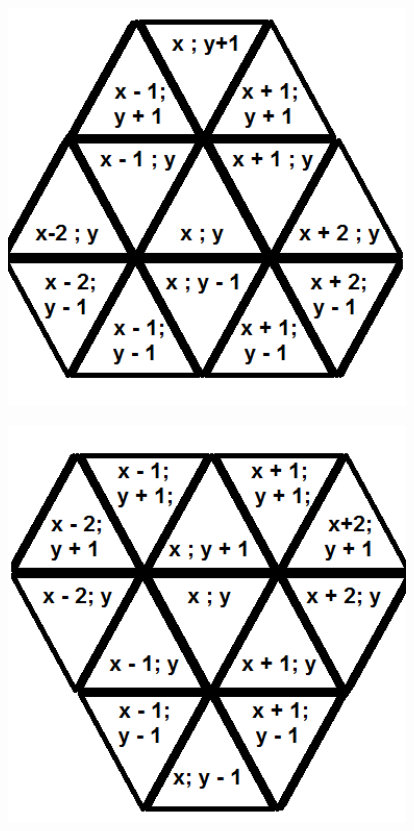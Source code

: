\documentclass{article}
\newenvironment{Figure}
  {\par\medskip\noindent\minipage{\linewidth}}
  {\endminipage\par\medskip}
\begin{document}
\begin{multicols}{2}
\begin{Figure}
 \includegraphics[width=0.79\textwidth]{imgs/triangle1.png}
\label{fig:triangle1std}
\end{Figure}
\begin{Figure}
 \centering
 \includegraphics[width=0.79\textwidth]{imgs/triangle2.png}
\label{fig:triangle2std}
\end{Figure}


\end{multicols}
\end{document}
